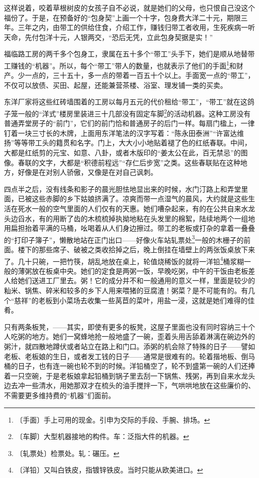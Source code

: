 \documentclass[12pt,UTF-8,openany]{ctexbook}
\begin{document}
\begin{large}
    这样说着，咬着草根树皮的女孩子自不必说，就是她们的父母，也只恨自己没这个福份了。于是，在预备好的“包身契”上画一个十字，包身费大洋二十元，期限三年。三年之内，由带工的供给住食，介绍工作，赚钱归带工者收用，生死疾病一听天命，先付包洋十元，人银两交，“恐后无凭，立此包身契据是实！”
    
    福临路工房的两千多个包身工，隶属在五十多个“带工”头手下，她们是顺从地替带工赚钱的“机器”。所以，每个“带工”带人的数量，也就表示了他们的手面\footnote{〔手面〕手上可用的现金。引申为交际的手段、手腕、排场。}和财产。少一点的，三十五十，多一点的带着一百五十个以上。手面宽一点的“带工”，不仅可以放债、买田、起屋，还能兼营茶楼、浴室、理发铺一类的买卖。
    
    东洋厂家将这些红砖墙围着的工房以每月五元的代价租给“带工”，“带工”就在这鸽子笼一般的“洋式”楼房里装进三十几部没有固定车脚\footnote{〔车脚〕大型机器接地的构件。车：泛指大件的机器。}的活动机器。这种工房没有普通弄堂房子的“前门”，它们的前门恰和普通房子的后门一样。每扇门楹上，一律钉着一块三寸长的木牌，上面用东洋笔法的汉字写着：“陈永田泰洲”“许富达维扬”等等带工头的籍贯和名字。门上，大大小小地贴着褪了色的红纸春联。中间，大都是红纸剪的元宝、如意、八卦，或者木版印的“姜太公在此，百无禁忌”的图像。春联的文字，大都是“积德前程远”“存仁后步宽”之类。这些春联贴在这种地方，好像是在对别人骄傲，又像是在对自己讽刺。
    
    四点半之后，没有线条和影子的晨光胆怯地显出来的时候，水门汀路上和弄堂里面，已被这些赤脚的乡下姑娘挤满了。凉爽而带一点湿气的晨风，大约就是这些生活在死水一般的空气里面的人们仅有的天惠。她们嘈杂起来，有的在公共自来水龙头边舀水，有的用断了齿的木梳梳掉执拗地粘在头发里的棉絮，陆续地两个一组地用扁担抬着平满的马桶，吆喝着从人们身边擦过。带工的老板或打杂的拿着一叠叠的“打印子簿子”，懒散地站在正门出口——好像火车站轧票处\footnote{〔轧票处〕检票处。轧：碾压。}一般的木栅子的前面。楼下的那些席子、破被之类收拾掉之后，晚上倒挂在墙壁上的两张饭桌放下来了。几十只碗，一把竹筷，胡乱地放在桌上，轮值烧稀饭的就将一洋铅\footnote{〔洋铅〕又叫白铁皮，指镀锌铁皮。当时只能从欧美进口。}桶浆糊一般的薄粥放在板桌中央。她们的定食是两粥一饭，早晚吃粥，中午的干饭由老板差人给她们送进工厂里去。粥！它的成分并不和一般通用的意义一样，里面是较少的籼米、锅焦、碎米和较多的乡下人用来喂猪的豆腐渣！粥菜？是不可能有的。有几个“慈祥”的老板到小菜场去收集一些莴苣的菜叶，用盐一浸，这就是她们难得的佳肴。
    
    只有两条板凳，——其实，即使有更多的板凳，这屋子里面也没有同时容纳三十个人吃粥的地方。她们一窝蜂地抢一般地盛了一碗，歪着头用舌舔着淋漓在碗边外的粥汁，就四散地蹲伏或者站立在路上和门口。添粥的机会除了特殊的日子——譬如老板、老板娘的生日，或者发工钱的日子——通常是很难有的。轮着揩地板、倒马桶的日子，也有连一碗也轮不到的时候。洋铅桶空了，轮不到盛第一碗的人们还捧着一只空碗，于是老板娘拿起铅桶到锅子里去刮一下锅焦、残粥，再到自来水龙头边去冲一些清水，用她那双才在梳头的油手搅拌一下，气哄哄地放在这些廉价的、不需要更多维持费的“机器”们面前。
    

\end{large}
\end{document}
